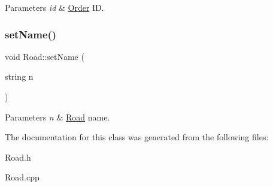 \begin{DoxyParams}{Parameters}
{\em id} & \hyperlink{class_order}{Order} ID. \\
\hline
\end{DoxyParams}
\mbox{\label{class_road_a393229b6ac7fd30dfd3280741d40008a}} 
\subsubsection{\texorpdfstring{set\+Name()}{setName()}}
{\footnotesize\ttfamily void Road\+::set\+Name (\begin{DoxyParamCaption}\item[{string}]{n }\end{DoxyParamCaption})}


\begin{DoxyParams}{Parameters}
{\em n} & \hyperlink{class_road}{Road} name. \\
\hline
\end{DoxyParams}


The documentation for this class was generated from the following files\+:\begin{DoxyCompactItemize}
\item 
Road.\+h\item 
Road.\+cpp\end{DoxyCompactItemize}
